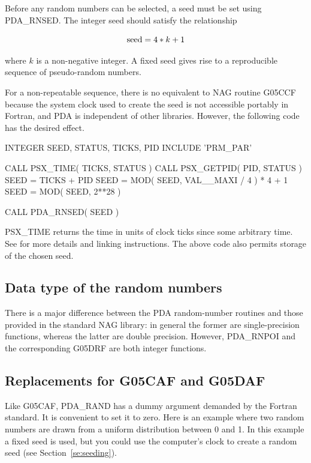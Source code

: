 \documentclass[11pt,twoside,nolof]{starlink}
\begin{document}
   Before any random numbers can be selected, a seed must be set
   using PDA\_RNSED.  The integer seed should satisfy the relationship

   \[ {\rm seed} = 4 * k + 1 \]

   where $k$ is a non-negative integer.  A fixed seed gives rise to a
   reproducible sequence of pseudo-random numbers.

   For a non-repeatable sequence, there is no equivalent to NAG
   routine G05CCF because the system clock used to create the seed is
   not accessible portably in Fortran, and PDA is independent of other
   libraries.  However, the following code has the desired effect.

\begin{terminalv}
      INTEGER SEED, STATUS, TICKS, PID
      INCLUDE 'PRM_PAR'

      CALL PSX_TIME( TICKS, STATUS )
      CALL PSX_GETPID( PID, STATUS )
      SEED = TICKS + PID
      SEED = MOD( SEED, VAL__MAXI / 4 ) * 4 + 1
      SEED = MOD( SEED, 2**28 )

      CALL PDA_RNSED( SEED )
\end{terminalv}

   PSX\_TIME returns the time in units of clock ticks since some
   arbitrary time.  See  for more details and
   linking instructions.  The above code also permits storage of
   the chosen seed.

\subsection{Data type of the random numbers}

   There is a major difference between the PDA random-number routines
   and those provided in the standard NAG library: in general the
   former are single-precision functions, whereas the latter are
   double precision.  However, PDA\_RNPOI and the corresponding G05DRF
   are both integer functions.

\subsection{Replacements for G05CAF and G05DAF}

   Like G05CAF, PDA\_RAND has a dummy argument demanded by the Fortran
   standard.  It is convenient to set it to zero.  Here is an example
   where two random numbers are drawn from a uniform distribution
   between 0 and 1.  In this example a fixed seed is used, but you
   could use the computer's clock to create a random seed (see
   Section~\ref{se:seeding}).
\end{document}
